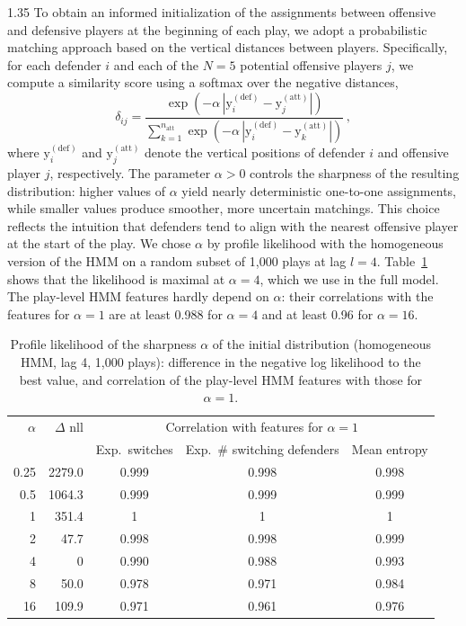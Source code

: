 \documentclass[12pt,a4paper]{article}
\begin{document}
\begin{spacing}{1.35}
To obtain an informed initialization of the assignments between offensive and defensive players at the beginning of each play, we adopt a probabilistic matching approach based on the vertical distances between players. Specifically, for each defender \( i \) and each of the \( N = 5 \) potential offensive players \( j \), we compute a similarity score using a softmax over the negative distances,
\[
\delta_{ij} = \frac{\exp(-\alpha \, |\mathrm{y}^{(\text{def})}_i - \mathrm{y}^{(\text{att})}_j|)}{\sum_{k=1}^{n_{\text{att}}} \exp(-\alpha \, |\mathrm{y}^{(\text{def})}_i - \mathrm{y}^{(\text{att})}_k|)} \, ,
\]
where \( \mathrm{y}^{(\text{def})}_i \) and \( \mathrm{y}^{(\text{att})}_j \) denote the vertical positions of defender \( i \) and offensive player \( j \), respectively.  
The parameter \( \alpha > 0 \) controls the sharpness of the resulting distribution: higher values of \( \alpha \) yield nearly deterministic one-to-one assignments, while smaller values produce smoother, more uncertain matchings. This choice reflects the intuition that defenders tend to align with the nearest offensive player at the start of the play. We chose $\alpha$ by profile likelihood with the homogeneous version of the HMM on a random subset of 1,000 plays at lag $l = 4$. Table~\ref{tab:alpha} shows that the likelihood is maximal at $\alpha = 4$, which we use in the full model. The play-level HMM features hardly depend on $\alpha$: their correlations with the features for $\alpha = 1$ are at least 0.988 for $\alpha = 4$ and at least 0.96 for $\alpha = 16$.

\begin{table}[ht]
\centering
\caption{Profile likelihood of the sharpness $\alpha$ of the initial distribution (homogeneous HMM, lag 4, 1,000 plays): difference in the negative log likelihood to the best value, and correlation of the play-level HMM features with those for $\alpha = 1$.}
\label{tab:alpha}
\begin{tabular}{rrccc}
\hline
$\alpha$ & $\Delta$ nll & \multicolumn{3}{c}{Correlation with features for $\alpha = 1$} \\
 & & Exp.\ switches & Exp.\ \# switching defenders & Mean entropy \\
\hline
0.25 & 2279.0 & 0.999 & 0.998 & 0.998 \\
0.5 & 1064.3 & 0.999 & 0.999 & 0.999 \\
1 & 351.4 & 1 & 1 & 1 \\
2 & 47.7 & 0.998 & 0.998 & 0.999 \\
4 & 0 & 0.990 & 0.988 & 0.993 \\
8 & 50.0 & 0.978 & 0.971 & 0.984 \\
16 & 109.9 & 0.971 & 0.961 & 0.976 \\
\hline
\end{tabular}
\end{table}  


\end{spacing}
\end{document}

